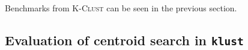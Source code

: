Benchmarks from \textsc{K-Clust} can be seen in the previous section.







\subsection{Evaluation of centroid search in \texttt{klust}}

